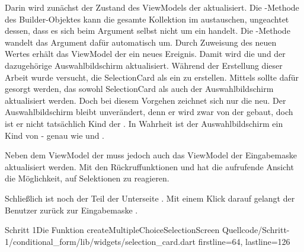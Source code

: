 Darin wird zunächst der Zustand des ViewModels der  aktualisiert. Die -Methode des Builder-Objektes kann die gesamte Kollektion im  austauschen, ungeachtet dessen, dass es sich beim Argument selbst nicht um ein  handelt. Die -Methode wandelt das Argument dafür automatisch um. Durch Zuweisung des neuen Wertes erhält das ViewModel der  ein neues Ereignis. Damit wird die  und der dazugehörige Auswahlbildschirm aktualisiert. Während der Erstellung dieser Arbeit wurde versucht, die SelectionCard als ein  zu erstellen. Mittels  sollte dafür gesorgt werden, das sowohl SelectionCard als auch der Auswahlbildschirm aktualisiert werden. Doch bei diesem Vorgehen zeichnet sich nur die  neu. Der Auswahlbildschirm bleibt unverändert, denn er wird zwar von der  gebaut, doch ist er nicht tatsächlich Kind der . In Wahrheit ist der Auswahlbildschirm ein Kind von  - genau wie  und .

Neben dem ViewModel der  muss jedoch auch das ViewModel der Eingabemaske aktualisiert werden. Mit den Rückruffunktionen   und   hat die aufrufende Ansicht die Möglichkeit, auf Selektionen zu reagieren.

Schließlich ist noch der  Teil der Unterseite . Mit einem Klick darauf gelangt der Benutzer zurück zur Eingabemaske .


\begin{alexlisting}{Schritt 1}{Die Funktion createMultipleChoiceSelectionScreen}
  {Quellcode/Schritt-1/conditional_form/lib/widgets/selection_card.dart}
  {firstline=64, lastline=126}
  \label{lst:Schritt1FunktionCreateMultipleChoiceSelectionScreen}
\end{alexlisting}
 
 
\clearpage